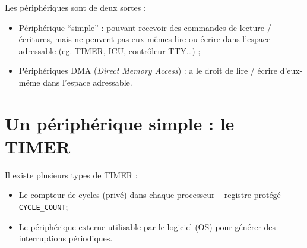 \documentclass[11pt,english,french]{scrreprt}
\theoremstyle{remark}
\theoremstyle{definition}
\begin{document}
Les périphériques sont de deux sortes :\begin{itemize}
	\item Périphérique ``simple'' : pouvant recevoir des commandes de lecture / écritures, mais ne peuvent pas eux-mêmes lire ou écrire dans l'espace adressable (eg. TIMER, ICU, contrôleur TTY\dots) ;
	\item Périphériques DMA (\emph{Direct Memory Access}) : a le droit de lire / écrire d'eux-même dans l'espace adressable.
\end{itemize}

\section{Un périphérique simple : le TIMER} %

Il existe plusieurs types de TIMER :\begin{itemize}
	\item Le compteur de cycles (privé) dans chaque processeur -- registre protégé \lstinline!CYCLE_COUNT!;
	\item Le périphérique externe utilisable par le logiciel (OS) pour générer des interruptions périodiques.
\end{itemize}
\end{document}
